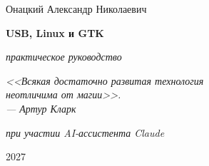 
\begin{titlepage}
\centering

\vspace*{3cm}

{\Large Онацкий Александр Николаевич\par}

\vspace{2cm}

{\Huge\bfseries USB, Linux и GTK\par}
\vspace{0.5cm}
{\LARGE\itshape практическое руководство\par}

\vspace{3cm}

\begin{minipage}{0.75\textwidth}
\centering\itshape
<<Всякая достаточно развитая технология\\
неотличима от магии>>.\\[0.3cm]
\upshape\small --- Артур Кларк
\end{minipage}

\vfill

{\small\itshape при участии AI-ассистента Claude\par}

\vspace{1cm}

{\large 2027\par}

\vspace*{1cm}

\end{titlepage}